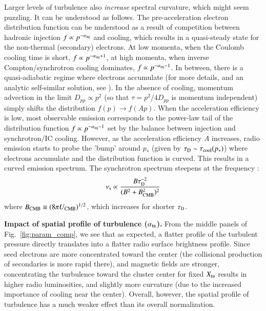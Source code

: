 \documentclass[fleqn,usenatbib,useAMS]{mnras}
\begin{document}
Larger levels of turbulence also {\it increase} spectral curvature, which might seem puzzling. It can be understood as follows. The pre-acceleration electron distribution function can be understood as a result of competition between hadronic injection $f \propto p^{-\alpha_{\rm inj}}$ and cooling, which results in a quasi-steady state for the non-thermal (secondary) electrons. At low momenta, when the Coulomb cooling time is short, $f \propto p^{-\alpha_{\rm inj}+1}$, at high momenta, when inverse Compton/synchrotron cooling dominates, $f \propto p^{-\alpha_{\rm inj} -1}$. In between, there is a quasi-adiabatic regime where electrons accumulate (for more details, and an analytic self-similar solution, see \citealt{1999ApJ...520..529S, pinzke13}). In the absence of cooling, momentum advection in the limit $D_{pp} \propto p^{2}$ (so that $\tau =p^{2}/4 D_{pp}$ is momentum independent) simply shifts the distribution $f(p) \rightarrow f(A p)$. 
When the acceleration efficiency is low, most observable emission corresponds to the power-law tail of the distribution function $f \propto p^{-\alpha_{\rm inj}-1}$ set by the balance between injection and synchrotron/IC cooling. However, as the acceleration efficiency $A$ increases, radio emission starts to probe the 'bump' around $p_{*}$ (given by $\tau_{\rm D} \sim \tau_{\rm cool}(p_{*})$) where electrons accumulate and the distribution function is curved. This results in a curved emission spectrum. The synchrotron spectrum steepens at the frequency \citep{2001MNRAS.320..365B}: 
\begin{equation}
\nu_{\rm s} \propto \frac{B \tau_{\rm D}^{-2}}{(B^{2}+B^{2}_{\rm CMB})^{2}}
\end{equation}
where $B_{\rm CMB} \equiv (8 \pi U_{\rm CMB})^{1/2}$, which increases for shorter $\tau_{\rm D}$.  

{\bf Impact of spatial profile of turbulence ($\alpha_{\rm tu}$).} From the middle panels of Fig.~\ref{fig:param_comp}, we see that as expected, a flatter profile of the turbulent pressure directly translates into a flatter radio surface brightness profile. Since seed electrons are more concentrated toward the center (the collisional production of secondaries is more rapid there), and magnetic fields are stronger, concentrating the turbulence toward the cluster center for fixed $X_{\rm tu}$ results in higher radio luminosities, and slightly more curvature (due to the increased importance of cooling near the center). Overall, however, the spatial profile of turbulence has a much weaker effect than its overall normalization. 
\end{document}
